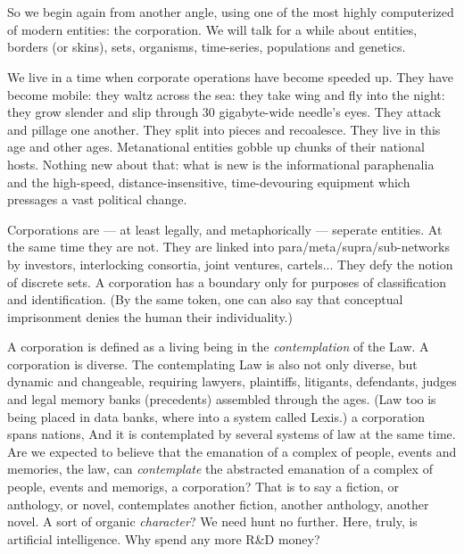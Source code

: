 \chapter{}

So we begin again from another angle,
using one of the most highly computerized
of modern entities: the corporation. We will
talk for a while about entities, borders (or
skins), sets, organisms, time-series, populations and genetics.

We live in a time when corporate operations have become speeded up. They have
become mobile: they waltz across the sea:
they take wing and fly into the night: they
grow slender and slip through 30 gigabyte-wide needle's eyes. They attack and pillage
one another. They split into pieces and recoalesce. They live in this age and other
ages. Metanational entities gobble up chunks
of their national hosts. Nothing new about
that: what is new is the informational paraphenalia and the high-speed, distance-insensitive, time-devouring equipment which
pressages a vast political change.

Corporations are --- at least legally, and
metaphorically --- seperate entities. At the
same time they are not. They are linked into
para/meta/supra/sub-networks by investors,
interlocking consortia,
joint ventures, cartels... They defy the notion of discrete sets.
A corporation has a boundary only for purposes of classification and identification.
(By the same token, one can also say that
conceptual imprisonment denies the human
their individuality.)

A corporation is defined as a living being
in the \emph{contemplation} of the Law. A corporation is diverse. The contemplating Law is
also not only diverse, but dynamic and
changeable, requiring lawyers, plaintiffs,
litigants, defendants, judges and legal memory banks (precedents) assembled through
the ages. (Law too is being placed in data
banks, where into a system called Lexis.)
a corporation spans nations,
And it is contemplated by several systems of law at
the same time. Are we expected to believe
that the emanation of a complex of people,
events and memories, the law, can \emph{contemplate} the abstracted emanation of a complex
of people, events and memorigs, a corporation? That is to say a fiction, or anthology, or
novel, contemplates another fiction, another
anthology, another novel. A sort of organic
\emph{character}? We need hunt no further. Here,
truly, is artificial intelligence. Why spend
any more R\&D money?

